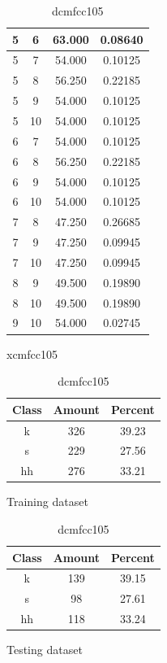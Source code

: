 \begin{table}
\begin{subtable}[tbp]{0.45\textwidth}
{\begin{tabular}{|c|c|c|c|}
 5 & 6 & 63.000 & 0.08640\\ \hline 
 5 & 7 & 54.000 & 0.10125\\ \hline 
 5 & 8 & 56.250 & 0.22185\\ \hline 
 5 & 9 & 54.000 & 0.10125\\ \hline 
 5 & 10 & 54.000 & 0.10125\\ \hline 
 6 & 7 & 54.000 & 0.10125\\ \hline 
 6 & 8 & 56.250 & 0.22185\\ \hline 
 6 & 9 & 54.000 & 0.10125\\ \hline 
 6 & 10 & 54.000 & 0.10125\\ \hline 
 7 & 8 & 47.250 & 0.26685\\ \hline 
 7 & 9 & 47.250 & 0.09945\\ \hline 
 7 & 10 & 47.250 & 0.09945\\ \hline 
 8 & 9 & 49.500 & 0.19890\\ \hline 
 8 & 10 & 49.500 & 0.19890\\ \hline 
 9 & 10 & 54.000 & 0.02745\\ \hline 

\end{tabular}
}\caption{xcmfcc105} \label{xlmfcc105}

\end{subtable}

\begin{subtable}[tbp]{0.45\textwidth}
\centering
\begin{tabular}{|c|c|c|}
\hline
Class & Amount & Percent\\ \hline
k & 326 & 39.23\\ \hline
s & 229 & 27.56\\ \hline
hh & 276 & 33.21\\ \hline
\end{tabular}
\caption{Training dataset}
\end{subtable}
\hfill
\begin{subtable}[tbp]{0.45\textwidth}
\centering
\begin{tabular}{|c|c|c|}
\hline
Class & Amount & Percent\\ \hline
k & 139 & 39.15\\ \hline
s & 98 & 27.61\\ \hline
hh & 118 & 33.24\\ \hline
\end{tabular}
\caption{Testing dataset}
\end{subtable}
\hfill

\caption{dcmfcc105}
\label{dlmfcc105}


\end{table}\clearpage


